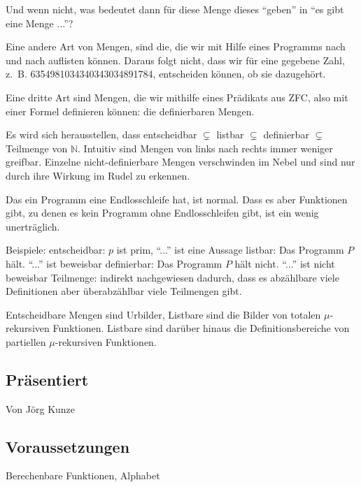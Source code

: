 \documentclass[a4paper]{amsart}
\theoremstyle{definition}
\newcommand{\N}{\ensuremath{\mathbb{ N }}}
\newcommand{\zb}{z.~B. }
\begin{document}
Und wenn nicht, was bedeutet dann für diese Menge dieses "`geben"' in "`es gibt eine Menge ..."'?

Eine andere Art von Mengen, sind die, die wir mit Hilfe eines Programms nach und nach auflisten können. Daraus folgt nicht, dass wir für eine gegebene Zahl, \zb 6354981034340343034891784, entscheiden können, ob sie dazugehört. 

Eine dritte Art sind Mengen, die wir mithilfe eines Prädikats aus ZFC, also mit einer Formel definieren können: die definierbaren Mengen.

Es wird sich herausstellen, dass entscheidbar $\subsetneq$ listbar $\subsetneq$ definierbar $\subsetneq$ Teilmenge von $\N$. Intuitiv sind Mengen von links nach rechts immer weniger greifbar. Einzelne nicht-definierbare Mengen verschwinden im Nebel und sind nur durch ihre Wirkung im Rudel zu erkennen.

Das ein Programm eine Endlosschleife hat, ist normal. Dass es aber Funktionen gibt, zu denen es kein Programm ohne Endlosschleifen gibt, ist ein wenig unerträglich. 

Beispiele:
entscheidbar: $p$ ist prim, "`..."' ist eine Aussage
listbar: Das Programm $P$ hält. "`..."' ist beweisbar
definierbar: Das Programm $P$ hält nicht. "`..."' ist nicht beweisbar
Teilmenge: indirekt nachgewiesen dadurch, dass es abzählbare viele Definitionen aber überabzählbar viele Teilmengen gibt. 

Entscheidbare Mengen sind Urbilder, Listbare sind die Bilder von totalen $\mu$-rekursiven Funktionen. Listbare sind darüber hinaus die Definitionsbereiche von partiellen $\mu$-rekursiven Funktionen. 


\subsection*{Präsentiert}
Von Jörg Kunze

\subsection*{Voraussetzungen}
Berechenbare Funktionen, Alphabet
\end{document}
